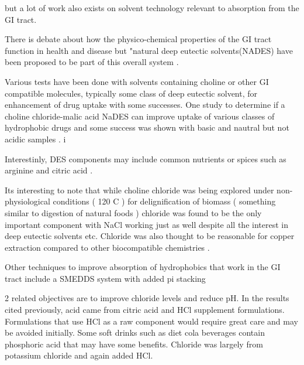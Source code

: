 but a lot of work also exists on solvent technology relevant to 
absorption from the GI tract.

There is debate about how the physico-chemical properties of the
GI tract function in health and disease but "natural deep eutectic
solvents(NADES) have been proposed
to be part of this overall system 
\cite{vanKempen_Boerboom_intestinal_mucous_2023}.

Various tests have been done with solvents containing choline  or other 
GI compatible molecules,
typically some class of deep eutectic solvent, 
for enhancement of drug uptake
\cite{MORRISON2009136}
\cite{DUARTE2017296}
\cite{Mustafa_Spelbos_Witkamp_Solubility_Stability_2021}
with some successes.
One study to determine if a choline chloride-malic acid NaDES
can improve uptake of various classes of hydrophobic drugs and some success was
shown with basic and nautral but not acidic samples
\cite{SANGIORGI2025126369}. i

Interestinly, DES components may include common nutrients or spices
such as arginine and citric acid
\cite{FERREIRA2025114332}.

Its interesting to note that while choline chloride was being
explored under non-physiological conditions ( 120 C ) for
delignification of biomass ( something similar to digestion
of natural foods ) chloride was found to be the only
important component with NaCl working just as well 
\cite{doi:10.1021/acs.iecr.9b03588} despite all the interest
in deep eutectic solvents etc. Chloride was also thought to be
reasonable  for copper extraction compared to other 
biocompatible chemistries  \cite{marchywka-MJM-2024-010-0.01rg}.


Other techniques to improve absorption of hydrophobics
that work in the GI tract include 
a SMEDDS system with added pi stacking
\cite{Abbasi_Higashino_Sato_Maximizing_Oral_Bioavailability_2021}


2 related objectives are to improve chloride levels and reduce
pH. In the results cited previously, acid came from citric 
acid and HCl supplement formulations. Formulations that
use HCl as a raw component would require great care and
may be avoided initially.  
Some soft drinks such as diet cola beverages contain phosphoric
acid that may have some benefits. 
Chloride was largely
from potassium chloride and again added HCl.   

